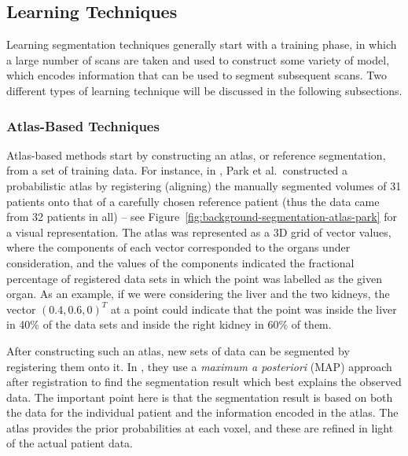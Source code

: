 \subsection{Learning Techniques}

Learning segmentation techniques generally start with a training phase, in which a large number of scans are taken and used to construct some variety of model, which encodes information that can be used to segment subsequent scans. Two different types of learning technique will be discussed in the following subsections.

\subsubsection{Atlas-Based Techniques}

Atlas-based methods start by constructing an atlas, or reference segmentation, from a set of training data. For instance, in \cite{park03}, Park et al.\ constructed a probabilistic atlas by registering (aligning) the manually segmented volumes of 31 patients onto that of a carefully chosen reference patient (thus the data came from 32 patients in all) -- see Figure~\ref{fig:background-segmentation-atlas-park} for a visual representation. The atlas was represented as a 3D grid of vector values, where the components of each vector corresponded to the organs under consideration, and the values of the components indicated the fractional percentage of registered data sets in which the point was labelled as the given organ. As an example, if we were considering the liver and the two kidneys, the vector $(0.4, 0.6, 0)^T$ at a point could indicate that the point was inside the liver in 40\% of the data sets and inside the right kidney in 60\% of them.

After constructing such an atlas, new sets of data can be segmented by registering them onto it. In \cite{park03}, they use a \emph{maximum a posteriori} (MAP) approach after registration to find the segmentation result which best explains the observed data. The important point here is that the segmentation result is based on both the data for the individual patient and the information encoded in the atlas. The atlas provides the prior probabilities at each voxel, and these are refined in light of the actual patient data.


